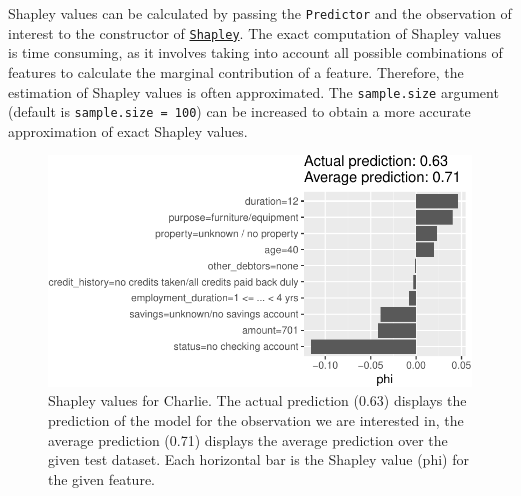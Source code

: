Shapley values can be calculated by passing the \texttt{Predictor} and
the observation of interest to the constructor of
\href{https://www.rdocumentation.org/packages/iml/topics/Shapley}{\texttt{Shapley}}.
The exact computation of Shapley values is time consuming, as it
involves taking into account all possible combinations of features to
calculate the marginal contribution of a feature. Therefore, the
estimation of Shapley values is often approximated. The
\texttt{sample.size} argument (default is \texttt{sample.size\ =\ 100})
can be increased to obtain a more accurate approximation of exact
Shapley values.

\begin{Shaded}
\begin{Highlighting}[]
\OtherTok{=}\SpecialCharTok{$}
   \NormalTok{)}
\SpecialCharTok{$}\NormalTok{()}
\end{Highlighting}
\end{Shaded}

\begin{figure}[H]

{\centering \includegraphics[width=1\textwidth,height=\textheight]{chapters/chapter12/model_interpretation_files/figure-pdf/fig-iml-shapley-1.pdf}

}

\caption{\label{fig-iml-shapley}Shapley values for Charlie. The actual
prediction (0.63) displays the prediction of the model for the
observation we are interested in, the average prediction (0.71) displays
the average prediction over the given test dataset. Each horizontal bar
is the Shapley value (phi) for the given feature.}

\end{figure}

